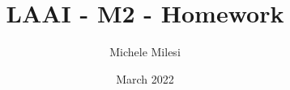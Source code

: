 \documentclass{article}
\title{LAAI - M2 - Homework}
\author{Michele Milesi}
\date{March 2022}
\begin{document}
\maketitle

\begin{abstract}
\end{abstract}








\end{document}
